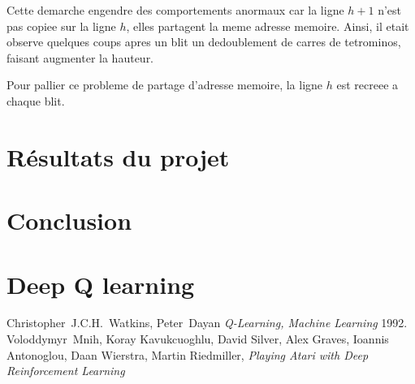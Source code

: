 \documentclass{article}
\begin{document}
Cette demarche engendre des comportements anormaux car la ligne \(h+1\) n'est
pas copiee sur la ligne \(h\), elles partagent la meme adresse memoire. Ainsi,
il etait observe quelques coups apres un blit un dedoublement de carres de
tetrominos, faisant augmenter la hauteur.

Pour pallier ce probleme de partage d'adresse memoire, la ligne \(h\) est
recreee a chaque blit.

\section{R\'esultats du projet}

\section*{Conclusion}

\appendix
\section{Deep Q learning}

\begin{thebibliography}{9}
    Christopher~J.C.H.~Watkins, Peter~Dayan
    \textit{Q-Learning, Machine Learning}
    1992.
    Voloddymyr~Mnih, Koray Kavukcuoghlu, David Silver, Alex Graves, Ioannis
    Antonoglou, Daan Wierstra, Martin Riedmiller,
    \textit{Playing Atari with Deep Reinforcement Learning}
\end{thebibliography}
\end{document}
